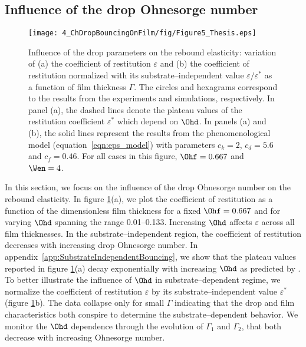 \subsection{Influence of the drop Ohnesorge number}
\begin{figure}
	\centering
	\texttt{[image: 4\_ChDropBouncingOnFilm/fig/Figure5\_Thesis.eps]}
	\caption{Influence of the drop parameters on the rebound elasticity: variation of (a) the coefficient of restitution $\varepsilon$ and (b) the coefficient of restitution normalized with its substrate--independent value $\varepsilon/\varepsilon^*$ as a function of film thickness $\Gamma$. The circles and hexagrams correspond to the results from the experiments and simulations, respectively. In panel (a), the dashed lines denote the plateau values of the restitution coefficient $\varepsilon^*$ which depend on $\Ohd$. In panels (a) and (b), the solid lines represent the results from the phenomenological model (equation~\eqref{eqn:eps_model}) with parameters $c_{k} = 2$, $c_{d} = 5.6$ and $c_{f} = 0.46$. For all cases in this figure, $\Ohf = 0.667$ and $\Wen = 4$.}
	\label{fig:controlParameters2}
\end{figure}
In this section, we focus on the influence of the drop Ohnesorge number on the rebound elasticity.
In figure \ref{fig:controlParameters2}(a), we plot the coefficient of restitution as a function of the dimensionless film thickness for a fixed $\Ohf = 0.667$ and for varying $\Ohd$ spanning the range 0.01--0.133. Increasing $\Ohd$ affects $\varepsilon$ across all film thicknesses. In the substrate--independent region, the coefficient of restitution decreases with increasing drop Ohnesorge number. In appendix~\ref{app:SubstrateIndependentBouncing}, we show that the plateau values reported in figure \ref{fig:controlParameters2}(a) decay exponentially with increasing $\Ohd$ as predicted by \citet{jha2020viscous}. To better illustrate the influence of $\Ohd$ in substrate--dependent regime, we normalize the coefficient of restitution $\varepsilon$ by its substrate--independent value $\varepsilon^*$ (figure \ref{fig:controlParameters2}b). The data collapse only for small $\Gamma$ indicating that the drop and film characteristics both conspire to determine the substrate--dependent behavior. We monitor the $\Ohd$ dependence through the evolution of $\Gamma_1$ and $\Gamma_2$, that both decrease with increasing Ohnesorge number.

